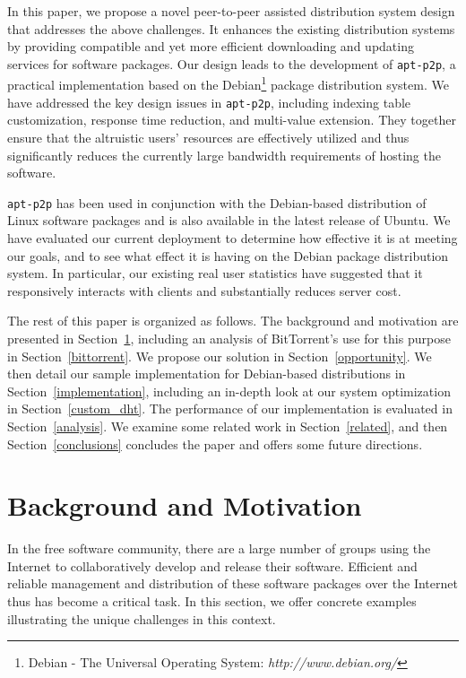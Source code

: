 \documentclass[conference]{IEEEtran}
\begin{document}
In this paper, we propose a novel peer-to-peer assisted distribution system design that
addresses the above challenges. It enhances the existing distribution systems by providing compatible and yet more efficient downloading and updating services
for software packages. Our design leads to the development of \texttt{apt-p2p}, a practical implementation based on the Debian\footnote{Debian - The Universal Operating System: {\it http://www.debian.org/}} package
distribution system.  We have addressed the key design issues in \texttt{apt-p2p}, including indexing table customization,
response time reduction, and multi-value extension. They together ensure
that the altruistic users' resources are effectively utilized and thus significantly reduces the currently
large bandwidth requirements of hosting the software.

\texttt{apt-p2p}  has been used in conjunction with the Debian-based distribution of Linux
software packages and is also available in the latest release of Ubuntu. We have evaluated our current deployment  to
determine how effective it is at meeting our goals, and to see what
effect it is having on the Debian package distribution system. In particular, our existing real user statistics
have suggested that it responsively interacts with clients and substantially reduces server cost.

The rest of this paper is organized as follows. The background and motivation are presented in Section~\ref{situation}, including an analysis of BitTorrent's use for this purpose in Section~\ref{bittorrent}. We propose
our solution in Section~\ref{opportunity}. We then detail our sample
implementation for Debian-based distributions in Section~\ref{implementation},
including an in-depth look at our system optimization
in Section~\ref{custom_dht}. The performance of our implementation is evaluated
in Section~\ref{analysis}. We examine some related work in Section~\ref{related}, and then
Section~\ref{conclusions} concludes the paper and offers some future directions.


\section{Background and Motivation}
\label{situation}

In the free software community, there are a large number of groups using the Internet to
collaboratively develop and release their software. Efficient and reliable management and distribution 
of these software packages over the Internet thus has become a critical task. In this section, we offer concrete examples illustrating the
unique challenges in this context.
\end{document}
